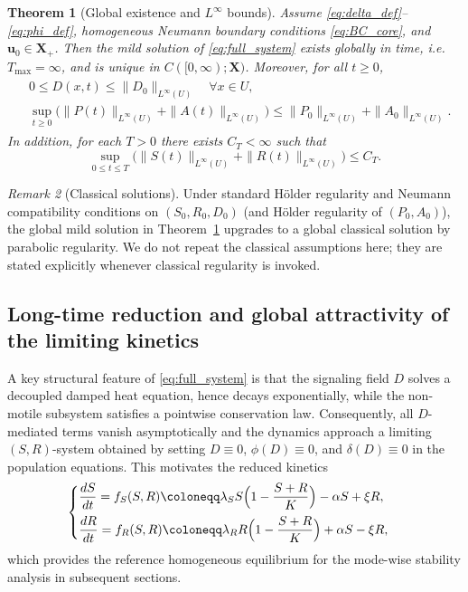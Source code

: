 \documentclass[pdflatex,sn-mathphys-ay]{sn-jnl}
\theoremstyle{thmstyleone}
\newtheorem{theorem}{Theorem}[section]
\theoremstyle{definition}
\theoremstyle{remark}
\newtheorem{remark}[theorem]{Remark}
\begin{document}
\begin{theorem}[Global existence and \texorpdfstring{$L^\infty$}{L-infinity} bounds]
\label{thm:global_wellposed}
Assume \eqref{eq:delta_def}--\eqref{eq:phi_def}, homogeneous Neumann boundary conditions \eqref{eq:BC_core},
and $\mathbf{u}_0\in\mathbf{X}_+$.
Then the mild solution of \eqref{eq:full_system} exists globally in time, i.e.\ $T_{\max}=\infty$, and is unique in
$C([0,\infty);\mathbf{X})$.
Moreover, for all $t\ge0$,
\begin{align}
\label{eq:global_bounds_D_PA}
\begin{aligned}
&0\le D(x,t)\le \|D_0\|_{L^\infty(U)}\quad \forall x\in U, \\[4pt]
&\sup_{t\ge0}\bigl(\|P(t)\|_{L^\infty(U)}+\|A(t)\|_{L^\infty(U)}\bigr)
\le \|P_0\|_{L^\infty(U)}+\|A_0\|_{L^\infty(U)}.
\end{aligned}
\end{align}
In addition, for each $T>0$ there exists $C_T<\infty$ such that
\begin{equation}
\label{eq:global_bounds_SR}
\sup_{0\le t\le T}\bigl(\|S(t)\|_{L^\infty(U)}+\|R(t)\|_{L^\infty(U)}\bigr)\le C_T.
\end{equation}
\end{theorem}

\begin{remark}[Classical solutions]\citep{ladyzenskaja_linear_1968,rothe_global_1984,gilbarg_elliptic_2001}
\label{rem:classical_solutions}
Under standard H\"older regularity and Neumann compatibility conditions on $(S_0,R_0,D_0)$ (and H\"older regularity of $(P_0,A_0)$),
the global mild solution in Theorem~\ref{thm:global_wellposed} upgrades to a global classical solution by parabolic regularity.
We do not repeat the classical assumptions here; they are stated explicitly whenever classical regularity is invoked.
\end{remark}

\subsection{Long-time reduction and global attractivity of the limiting kinetics}
\label{subsec:main_longtime}

A key structural feature of \eqref{eq:full_system} is that the signaling field $D$ solves a decoupled damped heat equation,
hence decays exponentially, while the non-motile subsystem satisfies a pointwise conservation law.
Consequently, all $D$-mediated terms vanish asymptotically and the dynamics approach a limiting $(S,R)$-system obtained by
setting $D\equiv0$, $\phi(D)\equiv 0$, and $\delta(D)\equiv0$ in the population equations.
This motivates the reduced kinetics
\begin{equation}
\label{eq:SR_reduced}
\begin{cases}
\dfrac{dS}{dt} = f_{S}(S,R)\coloneqq \lambda_{S}S\Bigl(1-\dfrac{S+R}{K}\Bigr)-\alpha S+\xi R, \\[8pt]
\dfrac{dR}{dt} = f_{R}(S,R)\coloneqq \lambda_{R}R\Bigl(1-\dfrac{S+R}{K}\Bigr)+\alpha S-\xi R,
\end{cases}
\end{equation}
which provides the reference homogeneous equilibrium for the mode-wise stability analysis in subsequent sections.
\end{document}
